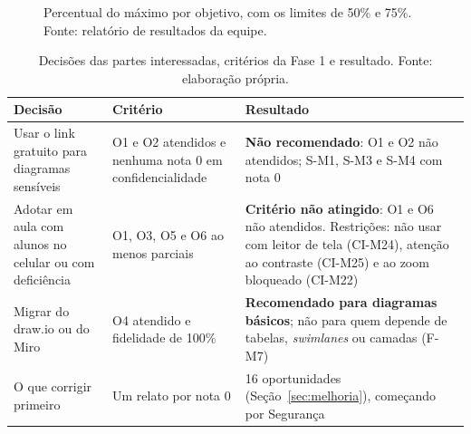 \documentclass[conference]{IEEEtran}
\begin{document}
\begin{figure}[!t]
\centering
{}
\caption{Percentual do máximo por objetivo, com os limites de 50\% e 75\%. Fonte: relatório de resultados da equipe.}
\label{fig:objetivos}
\end{figure}

\begin{table}[!t]
\caption{Decisões das partes interessadas, critérios da Fase 1 e resultado. Fonte: elaboração própria.}
\label{tab:decisoes}
\centering
\scriptsize
\setlength{\tabcolsep}{2.5pt}
\begin{tabular}{@{}L{1.55cm} L{2.2cm} L{4.4cm}@{}}
\toprule
\textbf{Decisão} & \textbf{Critério} & \textbf{Resultado}\\
\midrule
Usar o link gratuito para diagramas sensíveis & O1 e O2 atendidos e nenhuma nota 0 em confidencialidade & \textbf{Não recomendado}: O1 e O2 não atendidos; S-M1, S-M3 e S-M4 com nota 0\\
Adotar em aula com alunos no celular ou com deficiência & O1, O3, O5 e O6 ao menos parciais & \textbf{Critério não atingido}: O1 e O6 não atendidos. Restrições: não usar com leitor de tela (CI-M24), atenção ao contraste (CI-M25) e ao zoom bloqueado (CI-M22)\\
Migrar do draw.io ou do Miro & O4 atendido e fidelidade de 100\% & \textbf{Recomendado para diagramas básicos}; não para quem depende de tabelas, \textit{swimlanes} ou camadas (F-M7)\\
O que corrigir primeiro & Um relato por nota 0 & 16 oportunidades (Seção~\ref{sec:melhoria}), começando por Segurança\\
\bottomrule
\end{tabular}
\end{table}
\end{document}
